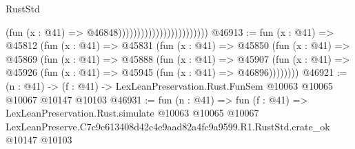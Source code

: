 \begin{lexlean}{RustStd}
\begin{coremodule}
                                                  (fun (x : @41) => @46848))))))))))))))))))))))))
@46913 := fun (x : @41) =>
  @45812
    (fun (x : @41) =>
    @45831
      (fun (x : @41) =>
      @45850
        (fun (x : @41) =>
        @45869
          (fun (x : @41) =>
          @45888
            (fun (x : @41) =>
            @45907
              (fun (x : @41) => @45926 (fun (x : @41) => @45945 (fun (x : @41) => @46896))))))))
@46921 := (n : @41) ->
  (f : @41) -> LexLeanPreservation.Rust.FunSem @10063 @10065 @10067 @10147 @10103
@46931 := fun (n : @41) =>
  fun (f : @41) =>
  LexLeanPreservation.Rust.simulate
    @10063
    @10065
    @10067
    LexLeanPreserve.C7c9c613408d42c4e9aad82a4fc9a9599.R1.RustStd.crate_ok
    @10147
    @10103
\end{coremodule}
\end{lexlean}
